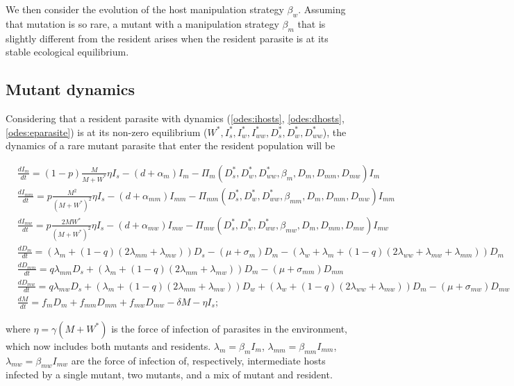 \documentclass{article}
\begin{document}
We then consider the evolution of the host manipulation strategy $\beta_w$. 
Assuming that mutation is so rare, a mutant with a manipulation strategy $\beta_m$ that is slightly different from the resident arises when the resident parasite is at its stable ecological equilibrium.

\subsection{Mutant dynamics}
Considering that a resident parasite with dynamics (\ref{odes:ihosts}, \ref{odes:dhosts}, \ref{odes:eparasite}) is at its non-zero equilibrium ($W^*, I_s^*, I_w^*, I_{ww}^*, D_s^*, D_w^*, D_{ww}^*$), the dynamics of a rare mutant parasite that enter the resident population will be

\begin{subequations}
\begin{align}
& \frac{dI_m}{dt} = (1 - p) \frac{M}{M + W^*} \eta I_s - (d + \alpha_m) I_m -\Pi_m(D_s^*, D_w^*,  D_{ww}^*,  \beta_m, D_m, D_{mm}, D_{mw}) I_m \\
& \frac{dI_{mm}}{dt} = p \frac{M^2}{(M + W^*)^2} \eta I_s - (d + \alpha_{mm}) I_{mm} - \Pi_{mm}(D_s^*, D_w^*, D_{ww}^*, \beta_{mm}, D_m, D_{mm}, D_{mw}) I_{mm}\\
& \frac{dI_{mw}}{dt} =  p \frac{2 M W^*}{(M + W^*)^2} \eta I_s - (d + \alpha_{mw}) I_{mw} -\Pi_{mw}(D_s^*, D_w^*, D_{ww}^*, \beta_{mw}, D_m, D_{mm}, D_{mw}) I_{mw} \\
& \frac{dD_m}{dt} = ( \lambda_m + (1 - q) (2 \lambda_{mm} + \lambda_{mw})) D_s - (\mu + \sigma_m) D_m - (\lambda_w + \lambda_m + (1 - q) (2 \lambda_{ww} + \lambda_{mw} + \lambda_{mm}) ) D_m \\
& \frac{dD_{mm}}{dt} = q \lambda_{mm} D_s + (\lambda_m + (1 - q)(2 \lambda_{mm} + \lambda_{mw})) D_m - (\mu + \sigma_{mm}) D_{mm} \\
& \frac{dD_{mw}}{dt} = q \lambda_{mw} D_s + (\lambda_m + (1 - q)(2 \lambda_{mm} + \lambda_{mw})) D_w + (\lambda_w + (1 - q) (2 \lambda_{ww} + \lambda_{mw})) D_m - (\mu + \sigma_{mw}) D_{mw} \\
& \frac{dM}{dt} = f_m D_m + f_{mm} D_{mm} +  f_{mw} D_{mw} - \delta M - \eta I_s;
\end{align}
\label{odes:mutdynamics}
\end{subequations}

where $\eta =\gamma (M + W^*)$ is the force of infection of parasites in the environment, which now includes both mutants and residents. $\lambda_m = \beta_m I_m$, $\lambda_{mm} = \beta_{mm} I_{mm}$, $\lambda_{mw} = \beta_{mw} I_{mw}$ are the force of infection of, respectively, intermediate hosts infected by a single mutant, two mutants, and a mix of mutant and resident. 
\end{document}
